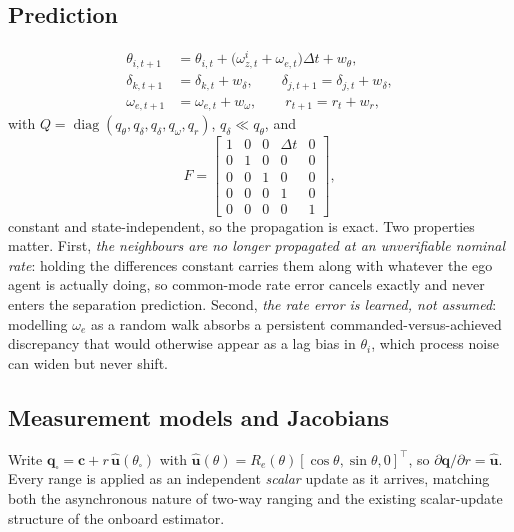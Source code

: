 \documentclass[11pt,a4paper]{article}
\newcommand{\q}{\bm{q}}
\newcommand{\cv}{\bm{c}}
\newcommand{\Rot}{R}
\begin{document}
\subsection{Prediction}

\begin{align}
\theta_{i,t+1} &= \theta_{i,t} + \big(\omega_{z,t}^{i} + \omega_{e,t}\big)\Delta t + w_\theta, \\
\delta_{k,t+1} &= \delta_{k,t} + w_\delta, \qquad \delta_{j,t+1} = \delta_{j,t} + w_\delta, \\
\omega_{e,t+1} &= \omega_{e,t} + w_\omega, \qquad r_{t+1} = r_t + w_r ,
\end{align}
with $Q = \operatorname{diag}(q_\theta,q_\delta,q_\delta,q_\omega,q_r)$,
$q_\delta \ll q_\theta$, and
\begin{equation}
F = \begin{bmatrix}
1&0&0&\Delta t&0\\ 0&1&0&0&0\\ 0&0&1&0&0\\ 0&0&0&1&0\\ 0&0&0&0&1
\end{bmatrix},
\end{equation}
constant and state-independent, so the propagation is exact. Two properties
matter. First, \emph{the neighbours are no longer propagated at an unverifiable
nominal rate}: holding the differences constant carries them along with whatever
the ego agent is actually doing, so common-mode rate error cancels exactly and
never enters the separation prediction. Second, \emph{the rate error is learned,
not assumed}: modelling $\omega_e$ as a random walk absorbs a persistent
commanded-versus-achieved discrepancy that would otherwise appear as a lag bias
in $\theta_i$, which process noise can widen but never shift.

\subsection{Measurement models and Jacobians}

Write $\q_\square = \cv + r\,\hat{\bm u}(\theta_\square)$ with
$\hat{\bm u}(\theta) = \Rot_e(\theta)[\cos\theta,\sin\theta,0]^\top$, so
$\partial\q/\partial r = \hat{\bm u}$. Every range is applied as an independent
\emph{scalar} update as it arrives, matching both the asynchronous nature of
two-way ranging and the existing scalar-update structure of the onboard
estimator.
\end{document}
